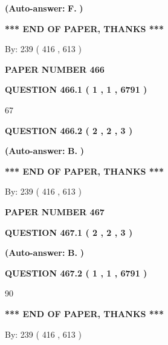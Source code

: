 \documentclass[12pt]{article}
\begin{document}
 
{\textbf{(Auto-answer:}}
{\textbf{\large{
F.}}}
{\textbf{)}}
 
 
   
   
   
   
\vspace{1.0in} 
{\textbf{\large{ *** END OF PAPER, THANKS *** }}} 
   
   
\hspace{1.0in} By: 
 239 ( 416 ,  613 )
   
   
   
   
\newpage 
\setcounter{page}{ 
   466001 } 
   
   
 {\textbf{ \Large{ PAPER NUMBER  466  }}}
   
   
   
   
  
  
{\textbf{\large{QUESTION
466.1 
 ( 1 , 1 , 6791 )
}}}

67
  
  
{\textbf{\large{QUESTION
466.2 
 ( 2 , 2 , 3 )
}}}
 
 
{\textbf{(Auto-answer:}}
{\textbf{\large{
B.}}}
{\textbf{)}}
 
 
   
   
   
   
\vspace{1.0in} 
{\textbf{\large{ *** END OF PAPER, THANKS *** }}} 
   
   
\hspace{1.0in} By: 
 239 ( 416 ,  613 )
   
   
   
   
\newpage 
\setcounter{page}{ 
   467001 } 
   
   
 {\textbf{ \Large{ PAPER NUMBER  467  }}}
   
   
   
   
  
  
{\textbf{\large{QUESTION
467.1 
 ( 2 , 2 , 3 )
}}}
 
 
{\textbf{(Auto-answer:}}
{\textbf{\large{
B.}}}
{\textbf{)}}
 
 
  
  
{\textbf{\large{QUESTION
467.2 
 ( 1 , 1 , 6791 )
}}}

90
   
   
   
   
\vspace{1.0in} 
{\textbf{\large{ *** END OF PAPER, THANKS *** }}} 
   
   
\hspace{1.0in} By: 
 239 ( 416 ,  613 )
   
   
   
\end{document}
